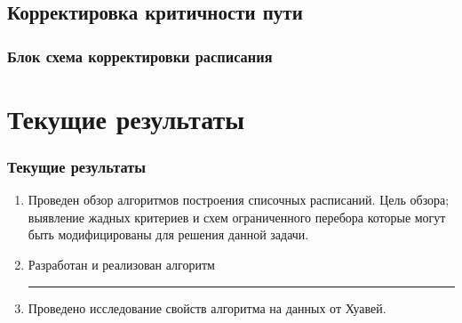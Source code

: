 \documentclass[hyperref=unicode, aspectratio=169]{beamer}
\begin{document}
\subsection{Корректировка критичности пути}
\begin{frame}
    \frametitle{Блок схема корректировки расписания}
    {\tiny
    }
\end{frame}

\section{Текущие результаты}
\begin{frame}
    \frametitle{Текущие результаты}
    \begin{enumerate}
        \item Проведен обзор алгоритмов построения списочных расписаний. Цель обзора; выявление жадных критериев и схем ограниченного перебора которые могут быть модифицированы для решения данной задачи.
        \item Разработан и реализован алгоритм
        \vspace{0.3cm}
        \hrule
        \vspace{0.2cm}
        \item Проведено исследование свойств алгоритма на данных от Хуавей.
    \end{enumerate}
\end{frame}
\end{document}
